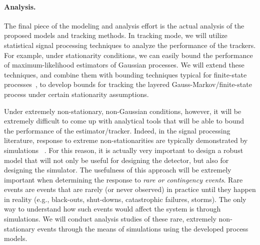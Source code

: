 \paragraph{Analysis.} The final piece of the modeling and analysis effort is the actual analysis of the proposed models and tracking methods. In tracking mode, we will utilize statistical signal processing techniques to analyze the performance of the trackers. For example, under stationarity conditions, we can easily bound the performance of maximum-likelihood estimators of Gaussian processes. We will extend these
techniques, and combine them with bounding techniques typical for
finite-state processes~\cite{Huang09}, to develop bounds for tracking the
layered Gauss-Markov/finite-state process  under certain stationarity assumptions.

Under extremely non-stationary, non-Gaussian conditions, however, it will be extremely difficult to come up with analytical tools that will be able to bound the performance of the estimator/tracker. Indeed, in the signal processing literature, response to extreme non-stationarities are typically demonstrated by simulations ~\cite{Yang95,Tanaka05}. For this reason, it is actually
very important to design a robust model that will not only be useful
for designing the detector, but also for designing the simulator.
The usefulness of this approach will be extremely important when
determining the response to {\em rare or contingency events}. Rare events are
events that are rarely (or never observed) in practice until they
happen in reality (e.g., black-outs, shut-downs, catastrophic
failures, storms). The only way to understand how such events would affect
the system is through simulations. We will conduct analysis studies
of these rare, extremely non-stationary events through the means of
simulations using the developed process models.
